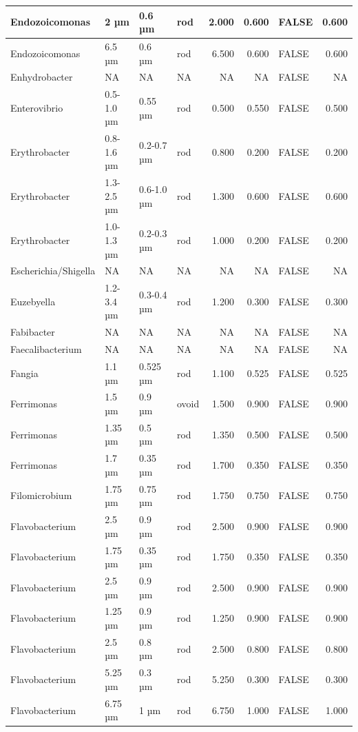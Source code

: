 \documentclass[
]{article}
\begin{document}
\begin{table}
\begin{tabular}{l|l|l|l|r|r|l|r}
\hline
Endozoicomonas & 2 µm & 0.6 µm & rod & 2.000 & 0.600 & FALSE & 0.600\\
\hline
Endozoicomonas & 6.5 µm & 0.6 µm & rod & 6.500 & 0.600 & FALSE & 0.600\\
\hline
Enhydrobacter & NA & NA & NA & NA & NA & FALSE & NA\\
\hline
Enterovibrio & 0.5-1.0 µm & 0.55 µm & rod & 0.500 & 0.550 & FALSE & 0.500\\
\hline
Erythrobacter & 0.8-1.6 µm & 0.2-0.7 µm & rod & 0.800 & 0.200 & FALSE & 0.200\\
\hline
Erythrobacter & 1.3-2.5 µm & 0.6-1.0 µm & rod & 1.300 & 0.600 & FALSE & 0.600\\
\hline
Erythrobacter & 1.0-1.3 µm & 0.2-0.3 µm & rod & 1.000 & 0.200 & FALSE & 0.200\\
\hline
Escherichia/Shigella & NA & NA & NA & NA & NA & FALSE & NA\\
\hline
Euzebyella & 1.2-3.4 µm & 0.3-0.4 µm & rod & 1.200 & 0.300 & FALSE & 0.300\\
\hline
Fabibacter & NA & NA & NA & NA & NA & FALSE & NA\\
\hline
Faecalibacterium & NA & NA & NA & NA & NA & FALSE & NA\\
\hline
Fangia & 1.1 µm & 0.525 µm & rod & 1.100 & 0.525 & FALSE & 0.525\\
\hline
Ferrimonas & 1.5 µm & 0.9 µm & ovoid & 1.500 & 0.900 & FALSE & 0.900\\
\hline
Ferrimonas & 1.35 µm & 0.5 µm & rod & 1.350 & 0.500 & FALSE & 0.500\\
\hline
Ferrimonas & 1.7 µm & 0.35 µm & rod & 1.700 & 0.350 & FALSE & 0.350\\
\hline
Filomicrobium & 1.75 µm & 0.75 µm & rod & 1.750 & 0.750 & FALSE & 0.750\\
\hline
Flavobacterium & 2.5 µm & 0.9 µm & rod & 2.500 & 0.900 & FALSE & 0.900\\
\hline
Flavobacterium & 1.75 µm & 0.35 µm & rod & 1.750 & 0.350 & FALSE & 0.350\\
\hline
Flavobacterium & 2.5 µm & 0.9 µm & rod & 2.500 & 0.900 & FALSE & 0.900\\
\hline
Flavobacterium & 1.25 µm & 0.9 µm & rod & 1.250 & 0.900 & FALSE & 0.900\\
\hline
Flavobacterium & 2.5 µm & 0.8 µm & rod & 2.500 & 0.800 & FALSE & 0.800\\
\hline
Flavobacterium & 5.25 µm & 0.3 µm & rod & 5.250 & 0.300 & FALSE & 0.300\\
\hline
Flavobacterium & 6.75 µm & 1 µm & rod & 6.750 & 1.000 & FALSE & 1.000\\

\end{tabular}
\end{table}
\end{document}
